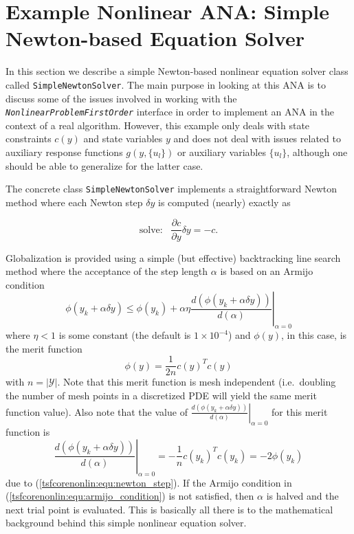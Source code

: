 %
\section{Example Nonlinear ANA: Simple Newton-based Equation Solver}
\label{tsfcorenonlin:sec:example_ana}
%

In this section we describe a simple Newton-based nonlinear equation
solver class called \texttt{Simple\-Newton\-Solver}.  The main purpose
in looking at this ANA is to discuss some of the issues involved in
working with the \texttt{\textit{Nonlinear\-Problem\-First\-Order}}
interface in order to implement an ANA in the context of a real
algorithm.  However, this example only deals with state constraints
$c(y)$ and state variables $y$ and does not deal with issues related
to auxiliary response functions $g(y,\{u_l\})$ or auxiliary variables
$\{u_l\}$, although one should be able to generalize for the
latter case.

The concrete class \texttt{Simple\-Newton\-Solver} implements a
straightforward Newton method where each Newton step $\delta y$ is
computed (nearly) exactly as

\begin{equation}
\mbox{solve:}\;\;\;\frac{\partial c}{\partial y} \delta y = -c.
\label{tsfcorenonlin:equ:newton_step}
\end{equation}

Globalization is provided using a simple (but effective) backtracking
line search method where the acceptance of the step length $\alpha$ is
based on an Armijo condition \cite{ref:dennis_schnabel_1996}
%
\begin{equation}
\phi(y_k + \alpha \delta y) \le \phi(y_k)
+ \alpha \eta \left.\frac{d(\phi(y_k + \alpha \delta y))}{d(\alpha)}\right|_{\alpha=0}
\label{tsfcorenonlin:equ:armijo_condition}
\end{equation}
%
where $\eta < 1$ is some constant (the default is $1\times{}10^{-4}$)
and $\phi(y)$, in this case, is the merit function 
%
\begin{equation}
\phi(y) = \frac{1}{2 n} c(y)^T c(y)
\end{equation}
%
with $n = |\mathcal{Y}|$.  Note that this merit function is mesh
independent (i.e.~doubling the number of mesh points in a discretized
PDE will yield the same merit function value).  Also note that the
value of $\left.\frac{d(\phi(y_k + \alpha \delta
y))}{d(\alpha)}\right|_{\alpha=0}$ for this merit function is
%
\begin{equation}
\left.\frac{d(\phi(y_k + \alpha \delta y))}{d(\alpha)}\right|_{\alpha=0} = -\frac{1}{n} c(y_k)^T c(y_k) = -2 \phi(y_k)
\label{tsfcorenonlin:equ:newton_merit_func_direc_deriv}
\end{equation}
%
due to (\ref{tsfcorenonlin:equ:newton_step}).  If the Armijo condition
in (\ref{tsfcorenonlin:equ:armijo_condition}) is not satisfied, then
$\alpha$ is halved and the next trial point is evaluated.  This is
basically all there is to the mathematical background behind this
simple nonlinear equation solver.

